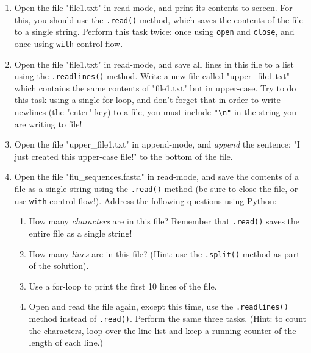 \documentclass{article}[12pt]
\newcommand{\code}[1]{\texttt{#1}}  %
\begin{document}
\begin{enumerate}[itemsep=5ex]
	
	\item Open the file "file1.txt" in read-mode, and print its contents to screen. For this, you should use the \code{.read()} method, which saves the contents of the file to a single string. Perform this task twice: once using \code{open} and \code{close}, and once using \code{with} control-flow.
	
	\item Open the file "file1.txt" in read-mode, and save all lines in this file to a list using the \code{.readlines()} method. Write a new file called "upper\_file1.txt" which contains the same contents of "file1.txt" but in upper-case. Try to do this task using a single for-loop, and don't forget that in order to write newlines (the "enter" key) to a file, you must include \code{"\textbackslash n"} in the string you are writing to file!
	
	\item Open the file "upper\_file1.txt" in append-mode, and \emph{append} the sentence: "I just created this upper-case file!" to the bottom of the file. 
	
	\item Open the file "flu\_sequences.fasta" in read-mode, and save the contents of a file as a single string using the \code{.read()} method (be sure to close the file, or use \code{with} control-flow!). Address the following questions using Python:
	
	\begin{enumerate}[itemsep=2ex]
		\item How many \emph{characters} are in this file? Remember that \code{.read()} saves the entire file as a single string!
		\item How many \emph{lines} are in this file? (Hint: use the \code{.split()} method as part of the solution).
		\item Use a for-loop to print the first 10 lines of the file.
		\item Open and read the file again, except this time, use the \code{.readlines()} method instead of \code{.read()}. Perform the same three tasks. (Hint: to count the characters, loop over the line list and keep a running counter of the length of each line.)
	\end{enumerate}
\end{enumerate}
\end{document}
